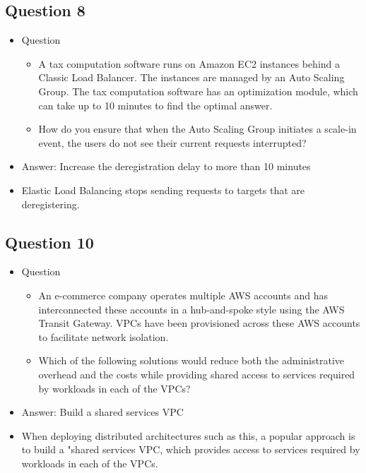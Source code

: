 \documentclass[]{scrartcl}
\begin{document}
\subsection{Question 8}
\begin{itemize}
	\item Question
	\begin{itemize}
		\item A tax computation software runs on Amazon EC2 instances behind a Classic Load Balancer. The instances are managed by an Auto Scaling Group. The tax computation software has an optimization module, which can take up to 10 minutes to find the optimal answer.
		\item How do you ensure that when the Auto Scaling Group initiates a scale-in event, the users do not see their current requests interrupted?
	\end{itemize}
	\item Answer: Increase the deregistration delay to more than 10 minutes
	\item Elastic Load Balancing stops sending requests to targets that are deregistering. 
\end{itemize}

\subsection{Question 10}
\begin{itemize}
	\item Question
	\begin{itemize}
		\item An e-commerce company operates multiple AWS accounts and has interconnected these accounts in a hub-and-spoke style using the AWS Transit Gateway. VPCs have been provisioned across these AWS accounts to facilitate network isolation.
		\item Which of the following solutions would reduce both the administrative overhead and the costs while providing shared access to services required by workloads in each of the VPCs?
	\end{itemize}
	\item Answer: Build a shared services VPC
	\item When deploying distributed architectures such as this, a popular approach is to build a "shared services VPC, which provides access to services required by workloads in each of the VPCs.
\end{itemize}
\end{document}
